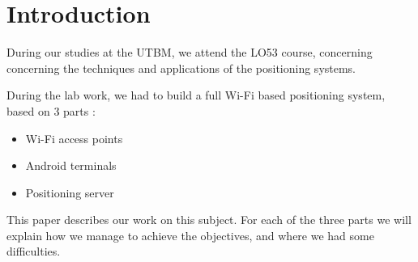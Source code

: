 \section*{Introduction}

During our studies at the UTBM, we attend the LO53 course, concerning
concerning the techniques and applications of the positioning systems. 

During the lab work, we had to build a full Wi-Fi based positioning system,
based on 3 parts :

\begin{itemize}
    \item Wi-Fi access points
    \item Android terminals
    \item Positioning server
\end{itemize}

This paper describes our work on this subject. For each of the three parts we
will explain how we manage to achieve the objectives, and where we had some
difficulties.




